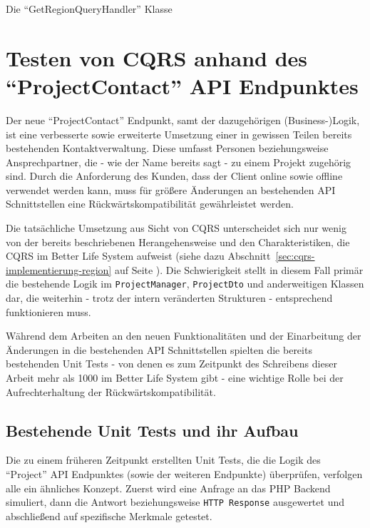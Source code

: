 \documentclass[a4paper,12pt,twoside]{scrreprt}
\begin{document}
\begin{listing}[ht]
    \inputminted[fontsize=\footnotesize,linenos,breaklines]{php}{code/get_region_queryhandler.php}
    \caption[Die \enquote{GetRegionQueryHandler} Klasse]{Die \enquote{GetRegionQueryHandler} Klasse}
    \label{code:get-region-queryhandler}
\end{listing}

\section{Testen von CQRS anhand des \enquote{ProjectContact} API Endpunktes}
\label{sec:cqrs-implementierung-project-contact}
Der neue \enquote{ProjectContact} Endpunkt, samt der dazugehörigen (Business-)Logik, ist eine verbesserte sowie erweiterte Umsetzung einer in gewissen Teilen bereits bestehenden Kontaktverwaltung. Diese umfasst Personen beziehungsweise Ansprechpartner, die - wie der Name bereits sagt - zu einem Projekt zugehörig sind. Durch die Anforderung des Kunden, dass der Client online sowie offline verwendet werden kann, muss für größere Änderungen an bestehenden API Schnittstellen eine Rückwärtskompatibilität gewährleistet werden.

\medskip

Die tatsächliche Umsetzung aus Sicht von CQRS unterscheidet sich nur wenig von der bereits beschriebenen Herangehensweise und den Charakteristiken, die CQRS im Better Life System aufweist (siehe dazu Abschnitt~\ref{sec:cqrs-implementierung-region} auf Seite \pageref{sec:cqrs-implementierung-region}). Die Schwierigkeit stellt in diesem Fall primär die bestehende Logik im \texttt{ProjectManager}, \texttt{ProjectDto} und anderweitigen Klassen dar, die weiterhin - trotz der intern veränderten Strukturen - entsprechend funktionieren muss.

\medskip

Während dem Arbeiten an den neuen Funktionalitäten und der Einarbeitung der Änderungen in die bestehenden API Schnittstellen spielten die bereits bestehenden Unit Tests - von denen es zum Zeitpunkt des Schreibens dieser Arbeit mehr als 1000 im Better Life System gibt - eine wichtige Rolle bei der Aufrechterhaltung der Rückwärtskompatibilität.

\subsection{Bestehende Unit Tests und ihr Aufbau}
\label{sub-sec:v1-unit-tests}
Die zu einem früheren Zeitpunkt erstellten Unit Tests, die die Logik des \enquote{Project} API Endpunktes (sowie der weiteren Endpunkte) überprüfen, verfolgen alle ein ähnliches Konzept. Zuerst wird eine Anfrage an das PHP Backend simuliert, dann die Antwort beziehungsweise \texttt{HTTP Response} ausgewertet und abschließend auf spezifische Merkmale getestet.
\end{document}
